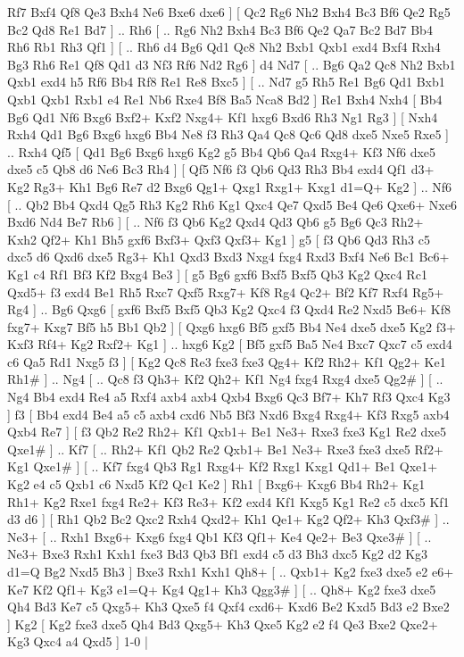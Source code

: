 Rf7  Bxf4 Qf8  Qe3 Bxh4  Ne6 Bxe6  dxe6   ]  [  Qc2 Rg6  Nh2 Bxh4  Bc3 Bf6  Qe2 Rg5  Bc2 Qd8  Re1 Bd7   ] .. Rh6 [ .. Rg6  Nh2 Bxh4  Bc3 Bf6  Qe2 Qa7  Bc2 Bd7  Bb4 Rh6  Rb1 Rh3  Qf1   ]  [ .. Rh6  d4 Bg6  Qd1 Qc8  Nh2 Bxb1  Qxb1 exd4  Bxf4 Rxh4  Bg3 Rh6  Re1 Qf8  Qd1 d3  Nf3 Rf6  Nd2 Rg6   ]  d4   Nd7 [ .. Bg6  Qa2 Qc8  Nh2 Bxb1  Qxb1 exd4  h5 Rf6  Bb4 Rf8  Re1 Re8  Bxc5   ]  [ .. Nd7  g5 Rh5  Re1 Bg6  Qd1 Bxb1  Qxb1 Qxb1  Rxb1 e4  Re1 Nb6  Rxe4 Bf8  Ba5 Nca8  Bd2   ]  Re1   Bxh4    Nxh4 [  Bb4 Bg6  Qd1 Nf6  Bxg6 Bxf2+  Kxf2 Nxg4+  Kf1 hxg6  Bxd6 Rh3  Ng1 Rg3   ]  [  Nxh4 Rxh4  Qd1 Bg6  Bxg6 hxg6  Bb4 Ne8  f3 Rh3  Qa4 Qc8  Qc6 Qd8  dxe5 Nxe5  Rxe5   ] .. Rxh4    Qf5 [  Qd1 Bg6  Bxg6 hxg6  Kg2 g5  Bb4 Qb6  Qa4 Rxg4+  Kf3 Nf6  dxe5 dxe5  c5 Qb8  d6 Ne6  Bc3 Rh4   ]  [  Qf5 Nf6  f3 Qb6  Qd3 Rh3  Bb4 exd4  Qf1 d3+  Kg2 Rg3+  Kh1 Bg6  Re7 d2  Bxg6 Qg1+  Qxg1 Rxg1+  Kxg1 d1=Q+  Kg2   ] .. Nf6 [ .. Qb2  Bb4 Qxd4  Qg5 Rh3  Kg2 Rh6  Kg1 Qxc4  Qe7 Qxd5  Be4 Qe6  Qxe6+ Nxe6  Bxd6 Nd4  Be7 Rb6   ]  [ .. Nf6  f3 Qb6  Kg2 Qxd4  Qd3 Qb6  g5 Bg6  Qc3 Rh2+  Kxh2 Qf2+  Kh1 Bh5  gxf6 Bxf3+  Qxf3 Qxf3+  Kg1   ]  g5 [  f3 Qb6  Qd3 Rh3  c5 dxc5  d6 Qxd6  dxe5 Rg3+  Kh1 Qxd3  Bxd3 Nxg4  fxg4 Rxd3  Bxf4 Ne6  Bc1 Bc6+  Kg1 c4  Rf1 Bf3  Kf2 Bxg4  Be3   ]  [  g5 Bg6  gxf6 Bxf5  Bxf5 Qb3  Kg2 Qxc4  Rc1 Qxd5+  f3 exd4  Be1 Rh5  Rxc7 Qxf5  Rxg7+ Kf8  Rg4 Qc2+  Bf2 Kf7  Rxf4 Rg5+  Rg4   ] .. Bg6    Qxg6 [  gxf6 Bxf5  Bxf5 Qb3  Kg2 Qxc4  f3 Qxd4  Re2 Nxd5  Be6+ Kf8  fxg7+ Kxg7  Bf5 h5  Bb1 Qb2   ]  [  Qxg6 hxg6  Bf5 gxf5  Bb4 Ne4  dxe5 dxe5  Kg2 f3+  Kxf3 Rf4+  Kg2 Rxf2+  Kg1   ] .. hxg6    Kg2 [  Bf5 gxf5  Ba5 Ne4  Bxc7 Qxc7  c5 exd4  c6 Qa5  Rd1 Nxg5  f3   ]  [  Kg2 Qc8  Re3 fxe3  fxe3 Qg4+  Kf2 Rh2+  Kf1 Qg2+  Ke1 Rh1#   ] .. Ng4 [ .. Qc8  f3 Qh3+  Kf2 Qh2+  Kf1 Ng4  fxg4 Rxg4  dxe5 Qg2#   ]  [ .. Ng4  Bb4 exd4  Re4 a5  Rxf4 axb4  axb4 Qxb4  Bxg6 Qc3  Bf7+ Kh7  Rf3 Qxc4  Kg3   ]  f3 [  Bb4 exd4  Be4 a5  c5 axb4  cxd6 Nb5  Bf3 Nxd6  Bxg4 Rxg4+  Kf3 Rxg5  axb4 Qxb4  Re7   ]  [  f3 Qb2  Re2 Rh2+  Kf1 Qxb1+  Be1 Ne3+  Rxe3 fxe3  Kg1 Re2  dxe5 Qxe1#   ] .. Kf7 [ .. Rh2+  Kf1 Qb2  Re2 Qxb1+  Be1 Ne3+  Rxe3 fxe3  dxe5 Rf2+  Kg1 Qxe1#   ]  [ .. Kf7  fxg4 Qb3  Rg1 Rxg4+  Kf2 Rxg1  Kxg1 Qd1+  Be1 Qxe1+  Kg2 e4  c5 Qxb1  c6 Nxd5  Kf2 Qc1  Ke2   ]  Rh1 [  Bxg6+ Kxg6  Bb4 Rh2+  Kg1 Rh1+  Kg2 Rxe1  fxg4 Re2+  Kf3 Re3+  Kf2 exd4  Kf1 Kxg5  Kg1 Re2  c5 dxc5  Kf1 d3  d6   ]  [  Rh1 Qb2  Bc2 Qxc2  Rxh4 Qxd2+  Kh1 Qe1+  Kg2 Qf2+  Kh3 Qxf3#   ] .. Ne3+ [ .. Rxh1  Bxg6+ Kxg6  fxg4 Qb1  Kf3 Qf1+  Ke4 Qe2+  Be3 Qxe3#   ]  [ .. Ne3+  Bxe3 Rxh1  Kxh1 fxe3  Bd3 Qb3  Bf1 exd4  c5 d3  Bh3 dxc5  Kg2 d2  Kg3 d1=Q  Bg2 Nxd5  Bh3   ]  Bxe3   Rxh1    Kxh1   Qh8+ [ .. Qxb1+  Kg2 fxe3  dxe5 e2  e6+ Ke7  Kf2 Qf1+  Kg3 e1=Q+  Kg4 Qg1+  Kh3 Qgg3#   ]  [ .. Qh8+  Kg2 fxe3  dxe5 Qh4  Bd3 Ke7  c5 Qxg5+  Kh3 Qxe5  f4 Qxf4  cxd6+ Kxd6  Be2 Kxd5  Bd3 e2  Bxe2   ]  Kg2    [  Kg2 fxe3  dxe5 Qh4  Bd3 Qxg5+  Kh3 Qxe5  Kg2 e2  f4 Qe3  Bxe2 Qxe2+  Kg3 Qxc4  a4 Qxd5   ] 1-0  |
